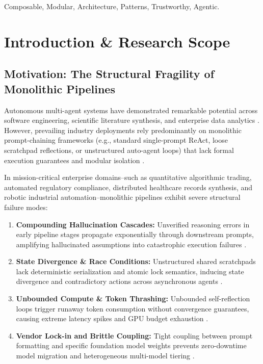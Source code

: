 \documentclass[10pt,journal,compsoc,twocolumn]{IEEEtran}
\begin{document}
\begin{IEEEkeywords}
Composable, Modular, Architecture, Patterns, Trustworthy, Agentic.
\end{IEEEkeywords}






\section{Introduction \& Research Scope}



\subsection{Motivation: The Structural Fragility of Monolithic Pipelines}


Autonomous multi-agent systems have demonstrated remarkable potential across software engineering, scientific literature synthesis, and enterprise data analytics \cite{arxiv_2005_14165,arxiv_2203_02155}. However, prevailing industry deployments rely predominantly on monolithic prompt-chaining frameworks (e.g., standard single-prompt ReAct, loose scratchpad reflections, or unstructured auto-agent loops) that lack formal execution guarantees and modular isolation \cite{arxiv_2312_03893}.

In mission-critical enterprise domains--such as quantitative algorithmic trading, automated regulatory compliance, distributed healthcare records synthesis, and robotic industrial automation--monolithic pipelines exhibit severe structural failure modes:
\begin{enumerate}
  \item \textbf{Compounding Hallucination Cascades:} Unverified reasoning errors in early pipeline stages propagate exponentially through downstream prompts, amplifying hallucinated assumptions into catastrophic execution failures \cite{arxiv_2406_00584}.
  \item \textbf{State Divergence \& Race Conditions:} Unstructured shared scratchpads lack deterministic serialization and atomic lock semantics, inducing state divergence and contradictory actions across asynchronous agents \cite{arxiv_2501_02497}.
  \item \textbf{Unbounded Compute \& Token Thrashing:} Unbounded self-reflection loops trigger runaway token consumption without convergence guarantees, causing extreme latency spikes and GPU budget exhaustion \cite{arxiv_2405_01543,arxiv_2406_04028}.
  \item \textbf{Vendor Lock-in and Brittle Coupling:} Tight coupling between prompt formatting and specific foundation model weights prevents zero-downtime model migration and heterogeneous multi-model tiering \cite{arxiv_2305_18290,arxiv_2208_14227}.
\end{enumerate}
\end{document}
